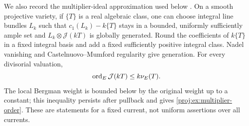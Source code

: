 We also record the multiplier-ideal approximation used below
\cite[Theorems~5.11, 6.27, and 14.2]{Proj-Demailly2012}. On a smooth projective variety, if \(\{T\}\)
is a real algebraic class, one can choose integral line bundles
\(L_k\) such that \(c_1(L_k)-k\{T\}\) stays in a bounded,
uniformly sufficiently ample set and
\(L_k\otimes\mathcal J(kT)\) is globally generated. Round the
coefficients of \(k\{T\}\) in a fixed integral basis and add a
fixed sufficiently positive integral class. Nadel vanishing and
Castelnuovo--Mumford regularity give generation. For every
divisorial valuation,
\begin{equation}\label{proj:ex:multiplier-order}
 \operatorname{ord}_E\mathcal J(kT)\leq k\nu_E(T).
\end{equation}
The local Bergman weight is bounded below by the original weight
up to a constant; this inequality persists after pullback and
gives \eqref{proj:ex:multiplier-order}. These are statements for a
fixed current, not uniform assertions over all currents.

